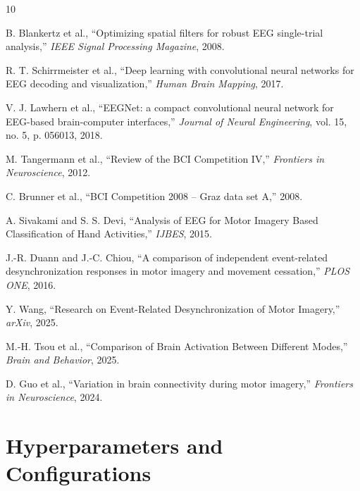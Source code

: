 \documentclass[conference]{IEEEtran}
\begin{document}
\begin{thebibliography}{10}

B. Blankertz et al., ``Optimizing spatial filters for robust EEG single-trial analysis,'' \textit{IEEE Signal Processing Magazine}, 2008.

R. T. Schirrmeister et al., ``Deep learning with convolutional neural networks for EEG decoding and visualization,'' \textit{Human Brain Mapping}, 2017.

V. J. Lawhern et al., ``EEGNet: a compact convolutional neural network for EEG-based brain-computer interfaces,'' \textit{Journal of Neural Engineering}, vol. 15, no. 5, p. 056013, 2018.

M. Tangermann et al., ``Review of the BCI Competition IV,'' \textit{Frontiers in Neuroscience}, 2012.

C. Brunner et al., ``BCI Competition 2008 -- Graz data set A,'' 2008.

A. Sivakami and S. S. Devi, ``Analysis of EEG for Motor Imagery Based Classification of Hand Activities,'' \textit{IJBES}, 2015.

J.-R. Duann and J.-C. Chiou, ``A comparison of independent event-related desynchronization responses in motor imagery and movement cessation,'' \textit{PLOS ONE}, 2016.

Y. Wang, ``Research on Event-Related Desynchronization of Motor Imagery,'' \textit{arXiv}, 2025.

M.-H. Tsou et al., ``Comparison of Brain Activation Between Different Modes,'' \textit{Brain and Behavior}, 2025.

D. Guo et al., ``Variation in brain connectivity during motor imagery,'' \textit{Frontiers in Neuroscience}, 2024.

\end{thebibliography}

\appendix
\section{Hyperparameters and Configurations}
\label{appendix:configs}
\end{document}

